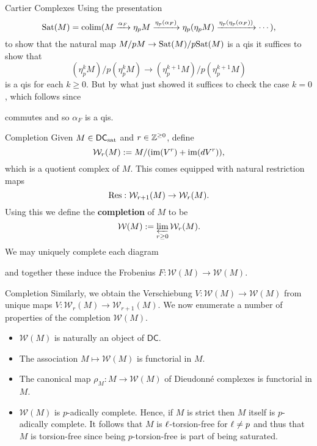 \documentclass[aspectratio=1610]{beamer}
\newcommand{\DC}{\mathsf{DC}}
\newcommand{\sat}{\textup{sat}}
\newcommand{\Sat}{\textup{Sat}}
\newcommand{\W}{\mathcal{W}}
\begin{document}
\begin{frame}[fragile]{Cartier Complexes}
Using the presentation
$$\Sat(M)=\colim(M\xto{\alpha_F}\eta_pM\xto{\eta_p(\alpha_F)}\eta_p(\eta_pM)\xto{\eta_p(\eta_p(\alpha_F))}\cdots),$$
to show that the natural map $M/pM\to\Sat(M)/p\Sat(M)$ is a qis it suffices to show that 
$$(\eta_p^kM)/p(\eta_p^kM)\to(\eta_p^{k+1}M)/p(\eta_p^{k+1}M)$$
is a qis for each $k\geq0$. But by what just showed it suffices to check the case $k=0$, which follows since
\begin{center}
\end{center}
commutes and so $\alpha_F$ is a qis.
\end{frame}

\begin{frame}[fragile]{Completion}
Given $M\in\DC_{\sat}$ and $r\in\mathbb{Z}^{\geq0}$, define 
$$\W_r(M):=M/(\im(V^r)+\im(dV^r)),$$
which is a quotient complex of $M$. This comes equipped with natural restriction maps 
$$\Res: \W_{r+1}(M)\to\W_r(M).$$
Using this we define the \textbf{completion} of $M$ to be 
$$\W(M):=\flim_{r\geq0}\W_r(M).$$
We may uniquely complete each diagram
\begin{center}
\end{center}
and together these induce the Frobenius $F: \W(M)\to\W(M)$.
\end{frame}

\begin{frame}{Completion}
Similarly, we obtain the Verschiebung $V: \W(M)\to\W(M)$ from unique maps $V: \W_r(M)\to\W_{r+1}(M)$. We now enumerate a number of properties of the completion $\W(M)$.

\begin{itemize}
\item $\W(M)$ is naturally an object of $\DC$.

\item The association $M\mapsto\W(M)$ is functorial in $M$.

\item The canonical map $\rho_M: M\to\W(M)$ of Dieudonn\'{e} complexes is functorial in $M$. 

\item $\W(M)$ is $p$-adically complete. Hence, if $M$ is strict then $M$ itself is $p$-adically complete. It follows that $M$ is $\ell$-torsion-free for $\ell\neq p$ and thus that $M$ is torsion-free since being $p$-torsion-free is part of being saturated.
\end{itemize}
\end{frame}
\end{document}
